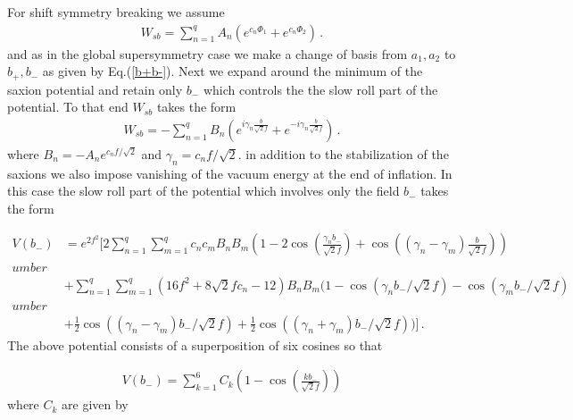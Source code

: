 \documentclass[12pt]{article}
\begin{document}
For shift symmetry breaking  we assume
\begin{align}
  W_{sb} = \sum_{n=1}^q A_n \left ( e^{c_n\Phi_1} + e^{c_n\Phi_2}\right)\,.
\end{align}
and as in the global supersymmetry case we make a change of basis from $a_1, a_2$ to $b_+, b_-$ as given by
Eq.(\ref{b+b-}).
Next we  expand around the minimum of the saxion potential and  retain only $b_-$ which controls the
the slow roll part of the potential. To that end
$W_{sb}$ takes the form
\begin{align}
  W_{sb}= -\sum_{n=1}^q B_n (e^{i\gamma_n\frac{b}{\sqrt 2 f}} + e^{-i\gamma_n \frac{b}{\sqrt 2f}})\,.
\end{align}
where $B_n= - A_n e^{c_n f/\sqrt 2}$ and $\gamma_n = c_n f/\sqrt 2$.
in addition to the stabilization of the saxions we also  impose vanishing of the vacuum energy
at the end of inflation. In this case the slow roll part of the potential which involves only the field $b_-$ takes the form

\begin{align}
  V(b_-) & =
  e^{2f^2}\Big[
    2\sum_{n=1}^q\sum_{m=1}^q  c_nc_mB_nB_m \left(1- 2 \cos(\frac{\gamma_n b_-}{\sqrt 2 f}) + \cos((\gamma_n-\gamma_m) \frac{b}{\sqrt 2 f})\right)\nonumber\\umber \\
         & + \sum_{n=1}^q\sum_{m=1}^q
    (16 f^2  + 8 \sqrt 2 f c_n -12)B_nB_m
    \Big(1-  \cos(\gamma_n b_-/ \sqrt 2f)-  \cos(\gamma_m b_-/ \sqrt 2f) \nonumber\\umber                                                                          \\
         & +\frac{1}{2} \cos((\gamma_n-\gamma_m) b_-/ \sqrt 2f)+ \frac{1}{2}  \cos((\gamma_n+\gamma_m) b_-/ \sqrt 2f)
    \Big)
    \Big]\,.
  \label{sugrapot}
\end{align}
The above potential consists of a superposition of six cosines so that

\begin{align}
  V(b_-)= \sum_{k=1}^{6} C_k \left(1-\cos(\frac{kb_-}{\sqrt 2 f})\right)
\end{align}
where $C_k$ are given by
\end{document}
